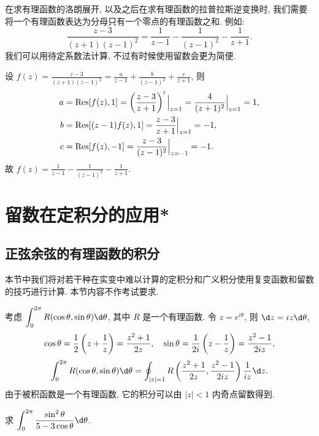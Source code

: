 在求有理函数的洛朗展开, 以及之后在求有理函数的拉普拉斯逆变换时, 我们需要将一个有理函数表达为分母只有一个零点的有理函数之和.
例如:
\[\frac{z-3}{(z+1)(z-1)^2}=\frac1{z-1}-\frac1{(z-1)^2}-\frac1{z+1}.\]
我们可以用待定系数法计算, 不过有时候使用留数会更为简便.

\begin{solution}
		设 $\displaystyle f(z)=\frac{z-3}{(z+1)(z-1)^2}=\frac a{z-1}+\frac b{(z-1)^2}+\frac c{z+1}$,
	{则
		\begin{align*}
			a&={\mathrm{Res}}[f(z),1]=\left(\frac{z-3}{z+1}\right)'\Big|_{z=1}=\frac 4{(z+1)^2}\Big|_{z=1}=1,\\
			b&={\mathrm{Res}}[(z-1)f(z),1]=\frac{z-3}{z+1}\Big|_{z=1}=-1,\\
			c&={\mathrm{Res}}[f(z),-1]=\frac{z-3}{(z-1)^2}\Big|_{z=-1}=-1.
		\end{align*}故 $\displaystyle f(z)=\frac1{z-1}-\frac1{(z-1)^2}-\frac1{z+1}$.
	}
\end{solution}

\section{留数在定积分的应用*}

\subsection{正弦余弦的有理函数的积分}

本节中我们将对若干种在实变中难以计算的定积分和广义积分使用复变函数和留数的技巧进行计算.
本节内容不作考试要求.

考虑 $\displaystyle\int_0^{2\pi} R(\cos\theta,\sin\theta)\d\theta$, 其中 $R$ 是一个有理函数.
令 $z=e^{i\theta}$, 则 $\d z=iz\d\theta$,
\[\cos\theta=\frac{1}{2}\left(z+\frac1z\right)=\frac{z^2+1}{2z},\quad
\sin\theta=\frac1{2i}\left(z-\frac1z\right)=\frac{z^2-1}{2iz},\]
	\[\int_0^{2\pi} R(\cos\theta,\sin\theta)\d\theta
	=\oint_{|z|=1} R\left(\frac{z^2+1}{2z},\frac{z^2-1}{2iz}\right)\frac1{iz}\d z.\]
由于被积函数是一个有理函数, 它的积分可以由 $|z|<1$ 内奇点留数得到.

\begin{example}
	求 $\displaystyle\int_0^{2\pi}\frac{\sin^2\theta}{5-3\cos\theta}\d\theta$.
\end{example}

